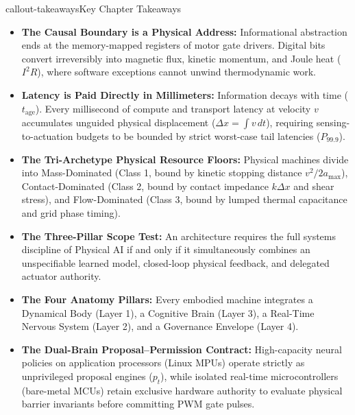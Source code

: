 \documentclass[
  10pt,
  letterpaper,
  twoside,
  openright,
  numbers=noenddot,
  headings=standardclasses
]{scrbook}
\begin{document}
\protect{}\label{callout-takeawaysux2a-1.10}
\begin{fbxSimple}{callout-takeaways}{Key Chapter Takeaways}{}
\label{callout-takeaways*-1.10}

\begin{itemize}
\tightlist
\item
  \textbf{The Causal Boundary is a Physical Address:} Informational
  abstraction ends at the memory-mapped registers of motor gate drivers.
  Digital bits convert irreversibly into magnetic flux, kinetic
  momentum, and Joule heat (\(I^2 R\)), where software exceptions cannot
  unwind thermodynamic work.
\item
  \textbf{Latency is Paid Directly in Millimeters:} Information decays
  with time (\(t_{\text{age}}\)). Every millisecond of compute and
  transport latency at velocity \(v\) accumulates unguided physical
  displacement (\(\Delta x = \int v \, dt\)), requiring
  sensing-to-actuation budgets to be bounded by strict worst-case tail
  latencies (\(P_{99.9}\)).
\item
  \textbf{The Tri-Archetype Physical Resource Floors:} Physical machines
  divide into Mass-Dominated (Class 1, bound by kinetic stopping
  distance \(v^2/2a_{\max}\)), Contact-Dominated (Class 2, bound by
  contact impedance \(k \Delta x\) and shear stress), and Flow-Dominated
  (Class 3, bound by lumped thermal capacitance and grid phase timing).
\item
  \textbf{The Three-Pillar Scope Test:} An architecture requires the
  full systems discipline of Physical AI if and only if it
  simultaneously combines an unspecifiable learned model, closed-loop
  physical feedback, and delegated actuator authority.
\item
  \textbf{The Four Anatomy Pillars:} Every embodied machine integrates a
  Dynamical Body (Layer 1), a Cognitive Brain (Layer 3), a Real-Time
  Nervous System (Layer 2), and a Governance Envelope (Layer 4).
\item
  \textbf{The Dual-Brain Proposal--Permission Contract:} High-capacity
  neural policies on application processors (Linux MPUs) operate
  strictly as unprivileged proposal engines (\(p_t\)), while isolated
  real-time microcontrollers (bare-metal MCUs) retain exclusive hardware
  authority to evaluate physical barrier invariants before committing
  PWM gate pulses.
\end{itemize}

\end{fbxSimple}
\end{document}
